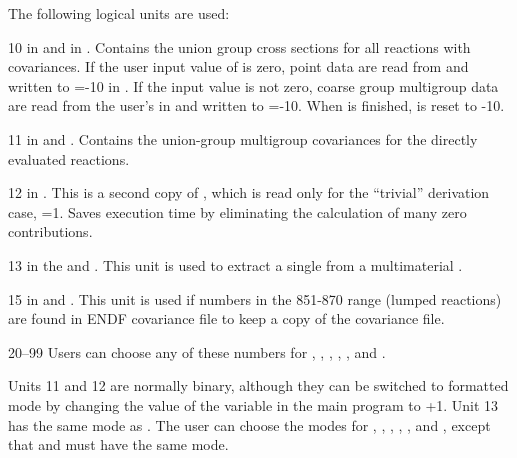 The following logical units are used:

\begin{description}
\begin{singlespace}

\item[10]    in  and  in .
Contains the union group cross sections for all reactions with
covariances.  If the user input value of  is zero, point
data are read from  and written to =-10 in
.  If the input value  is not zero, coarse
group multigroup data are read from the user's  in
 and written to =-10.  When  is
finished,  is reset to -10.

 \item[11]    in  and .
Contains the union-group multigroup covariances for the
directly evaluated reactions.

\item[12]    in .  This is a second copy
of , which is read only for the ``trivial'' derivation
case, =1.  Saves execution time by eliminating the
calculation of many zero contributions.

\item[13]   in the  and .
This unit is used to extract a single  from a multimaterial
.

\item[15]   in  and .
This unit is used if  numbers in the 851-870 range (lumped reactions)
are found in ENDF covariance file to keep a copy of the covariance file.

\item[20--99]   Users can choose any of these numbers for
, , , ,
, and .

\end{singlespace}
\end{description}

\noindent
Units 11 and 12 are normally binary, although they can be switched to
formatted mode by changing the value of the variable  in the main
program to +1.  Unit 13 has the same mode as .  The user
can choose the modes for , , ,
, , and , except that 
and  must have the same mode.

\cleardoublepage
